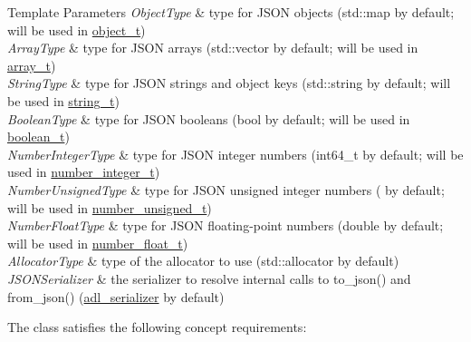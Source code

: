 \begin{DoxyTemplParams}{Template Parameters}
{\em Object\+Type} & type for J\+S\+ON objects ({\ttfamily std\+::map} by default; will be used in \mbox{\hyperlink{classnlohmann_1_1basic__json_aa1eb13d5aa86f80cbee6c58e90fbaf49}{object\+\_\+t}}) \\
\hline
{\em Array\+Type} & type for J\+S\+ON arrays ({\ttfamily std\+::vector} by default; will be used in \mbox{\hyperlink{classnlohmann_1_1basic__json_ae095578e03df97c5b3991787f1056374}{array\+\_\+t}}) \\
\hline
{\em String\+Type} & type for J\+S\+ON strings and object keys ({\ttfamily std\+::string} by default; will be used in \mbox{\hyperlink{classnlohmann_1_1basic__json_a61f8566a1a85a424c7266fb531dca005}{string\+\_\+t}}) \\
\hline
{\em Boolean\+Type} & type for J\+S\+ON booleans ({\ttfamily bool} by default; will be used in \mbox{\hyperlink{classnlohmann_1_1basic__json_a4c919102a9b4fe0d588af64801436082}{boolean\+\_\+t}}) \\
\hline
{\em Number\+Integer\+Type} & type for J\+S\+ON integer numbers ({\ttfamily int64\+\_\+t} by default; will be used in \mbox{\hyperlink{classnlohmann_1_1basic__json_a98e611d67b7bd75307de99c9358ab2dc}{number\+\_\+integer\+\_\+t}}) \\
\hline
{\em Number\+Unsigned\+Type} & type for J\+S\+ON unsigned integer numbers ({} by default; will be used in \mbox{\hyperlink{classnlohmann_1_1basic__json_ab906e29b5d83ac162e823ada2156b989}{number\+\_\+unsigned\+\_\+t}}) \\
\hline
{\em Number\+Float\+Type} & type for J\+S\+ON floating-\/point numbers ({\ttfamily double} by default; will be used in \mbox{\hyperlink{classnlohmann_1_1basic__json_a88d6103cb3620410b35200ee8e313d97}{number\+\_\+float\+\_\+t}}) \\
\hline
{\em Allocator\+Type} & type of the allocator to use ({\ttfamily std\+::allocator} by default) \\
\hline
{\em J\+S\+O\+N\+Serializer} & the serializer to resolve internal calls to {\ttfamily to\+\_\+json()} and {\ttfamily from\+\_\+json()} (\mbox{\hyperlink{structnlohmann_1_1adl__serializer}{adl\+\_\+serializer}} by default)\\
\hline
\end{DoxyTemplParams}
The class satisfies the following concept requirements\+:

